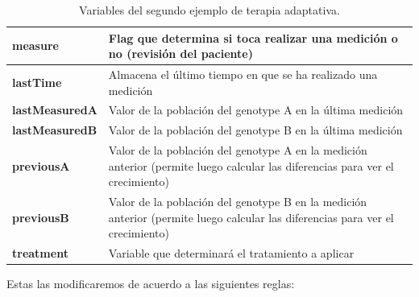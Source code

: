 \begin{table}[h]
	\footnotesize
	\begin{tabular}{|p{3cm}|p{12.5cm}|}
		\hline
		\textbf{measure} & Flag que determina si toca realizar una medición o no (revisión del paciente) \\ \hline
		\textbf{lastTime} & Almacena el último tiempo en que se ha realizado una medición \\ \hline
		\textbf{lastMeasuredA} & Valor de la población del \gls{genotype} A en la última medición \\ \hline
		\textbf{lastMeasuredB} & Valor de la población del \gls{genotype} B en la última medición \\ \hline
		\textbf{previousA} & Valor de la población del \gls{genotype} A en la medición anterior (permite luego calcular las diferencias para ver el crecimiento) \\ \hline
		\textbf{previousB} & Valor de la población del \gls{genotype} B en la medición anterior (permite luego calcular las diferencias para ver el crecimiento) \\ \hline
		\textbf{treatment} & Variable que determinará el tratamiento a aplicar \\ \hline
	\end{tabular}
	\caption{Variables del segundo ejemplo de terapia adaptativa.}
	\label{tab:ejemplocomplejovars}
\end{table}

Estas las modificaremos de acuerdo a las siguientes reglas:

